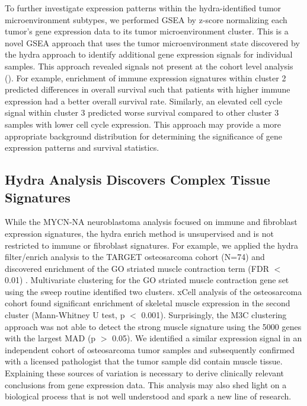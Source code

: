 \documentclass[10pt,letterpaper]{article}
\begin{document}
To further investigate expression patterns within the hydra-identified tumor microenvironment subtypes, we performed GSEA by z-score normalizing each tumor’s gene expression data to its tumor microenvironment cluster. This is a novel GSEA approach that uses the tumor microenvironment state discovered by the hydra approach to identify additional gene expression signals for individual samples. This approach revealed signals not present at the cohort level analysis (). For example, enrichment of immune expression signatures within cluster 2 predicted differences in overall survival such that patients with higher immune expression had a better overall survival rate. Similarly, an elevated cell cycle signal within cluster 3 predicted worse survival compared to other cluster 3 samples with lower cell cycle expression. This approach may provide a more appropriate background distribution for determining the significance of gene expression patterns and survival statistics.

\subsection{Hydra Analysis Discovers Complex Tissue Signatures}
While the MYCN-NA neuroblastoma analysis focused on immune and fibroblast expression signatures, the hydra enrich method is unsupervised and is not restricted to immune or fibroblast signatures. For example, we applied the hydra filter/enrich analysis to the TARGET osteosarcoma cohort (N=74) and discovered enrichment of the GO striated muscle contraction term (FDR $<$ 0.01) . Multivariate clustering for the GO striated muscle contraction gene set using the sweep routine identified two clusters. xCell analysis of the osteosarcoma cohort found significant enrichment of skeletal muscle expression in the second cluster (Mann-Whitney U test, p $<$ 0.001). Surprisingly, the M3C clustering approach was not able to detect the strong muscle signature using the 5000 genes with the largest MAD (p $>$ 0.05). We identified a similar expression signal in an independent cohort of osteosarcoma tumor samples and subsequently confirmed with a licensed pathologist that the tumor sample did contain muscle tissue. Explaining these sources of variation is necessary to derive clinically relevant conclusions from gene expression data. This analysis may also shed light on a biological process that is not well understood and spark a new line of research. 
\end{document}
